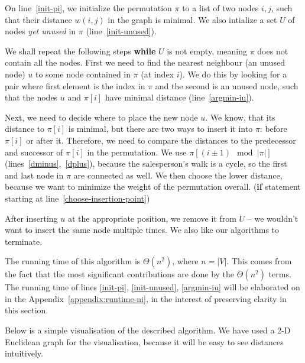 \documentclass{article}
\newcommand{\bb}[1]{\textbf{#1}}
\newcommand{\ii}[1]{\textit{#1}}
\begin{document}
On line~\ref*{init-pi}, we initialize the permutation $\pi$ to a list of two nodes
$i,j$, such that their distance $w(i,j)$ in the graph is minimal. We also intialize
a set $U$ of nodes \ii{yet unused} in $\pi$ (line~\ref*{init-unused}).

We shall repeat the following steps \bb{while} $U$ is not empty, meaning $\pi$
does not contain all the nodes. First we need to find the nearest neighbour
(an unused node) $u$ to some node contained in $\pi$ (at index $i$). We do this
by looking for a pair where first element is the index in $\pi$ and the second is
an unused node, such that the nodes $u$ and $\pi[i]$ have minimal distance
(line~\ref*{argmin-iu}).

Next, we need to decide where to place the new node $u$. We know, that its distance to
$\pi[i]$ is minimal, but there are two ways to insert it into $\pi$: before $\pi[i]$
or after it. Therefore, we need to compare the distances to the predecessor and
successor of $\pi[i]$ in the permutation. We use $\pi[(i\pm 1)\mod|\pi|]$
(lines~\ref*{dminus},~\ref*{dplus}), because the salesperson's walk is a cycle,
so the first and last node in $\pi$ are connected as well. We then choose the lower
distance, because we want to minimize the weight of the permutation overall.
(\bb{if} statement starting at line~\ref*{choose-insertion-point})

After inserting $u$ at the appropriate position, we remove it from $U$ -- we wouldn't want
to insert the same node multiple times. We also like our algorithms to terminate.

The running time of this algorithm is $\Theta(n^2)$, where $n=|V|$. This comes
from the fact that the most significant contributions are done by the $\Theta(n^2)$
terms. The running time of lines \ref*{init-pi}, \ref*{init-unused}, \ref*{argmin-iu}
will be elaborated on in the Appendix~\ref{appendix:runtime-ni}, in the interest of
preserving clarity in this section.

Below is a simple visualisation of the described algorithm. We have used a 2-D
Euclidean graph for the visualisation, because it will be easy to see distances
intuitively.
\\
\end{document}
